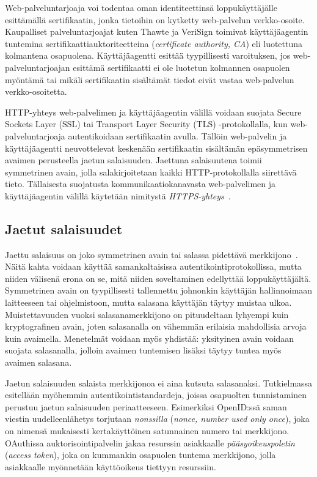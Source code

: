\documentclass[finnish,gradu]{tktltiki}
\begin{document}
  Web-palveluntarjoaja voi todentaa oman identiteettinsä loppukäyttäjälle esittämällä sertifikaatin, jonka tietoihin on kytketty web-palvelun verkko-osoite. Kaupalliset palveluntarjoajat kuten Thawte ja VeriSign toimivat käyttäjäagentin tuntemina sertifikaattiauktoriteetteina (\emph{certificate authority, CA}) eli luotettuna kolmantena osapuolena. Käyttäjäagentti esittää tyypillisesti varoituksen, jos web-palveluntarjoajan esittämä sertifikaatti ei ole luotetun kolmannen osapuolen myöntämä tai mikäli sertifikaatin sisältämät tiedot eivät vastaa web-palvelun verkko-osoitetta.

  HTTP-yhteys web-palvelimen ja käyttäjäagentin välillä voidaan suojata Secure Sockets Layer (SSL) tai Transport Layer Security (TLS) -protokollalla, kun web-pal\-ve\-luntarjoaja autentikoidaan sertifikaatin avulla. Tällöin web-palvelin ja käyttäjäagentti neuvottelevat keskenään sertifikaatin sisältämän epäsymmetrisen avaimen perusteella jaetun salaisuuden. Jaettuna salaisuutena toimii symmetrinen avain, jolla salakirjoitetaan kaikki HTTP-protokollalla siirettävä tieto. Tällaisesta suojatusta kommunikaatiokanavasta web-palvelimen ja käyttäjäagentin välillä käytetään nimitystä \emph{HTTPS-yhteys}~\cite{rfc_https_2818}.


  \subsection{Jaetut salaisuudet} %
  \label{sub:jaetut_salaisuudet}

  Jaettu salaisuus on joko symmetrinen avain tai salassa pidettävä merkkijono~\cite{NIST_SP800-63-1}. Näitä kahta voidaan käyttää samankaltaisissa autentikointiprotokollissa, mutta niiden välisenä erona on se, mitä niiden soveltaminen edellyttää loppukäyttäjältä. Symmetrinen avain on tyypillisesti tallennettu johnonkin käyttäjän hallinnoimaan laitteeseen tai ohjelmistoon, mutta salasana käyttäjän täytyy muistaa ulkoa. Muistettavuuden vuoksi salasanamerkkijono on pituudeltaan lyhyempi kuin kryptografinen avain, joten salasanalla on vähemmän erilaisia mahdollisia arvoja kuin avaimella. Menetelmät voidaan myös yhdistää: yksityinen avain voidaan suojata salasanalla, jolloin avaimen tuntemisen lisäksi täytyy tuntea myös avaimen salasana.

  Jaetun salaisuuden salaista merkkijonoa ei aina kutsuta salasanaksi. Tutkielmassa esitellään myöhemmin autentikointistandardeja, joissa osapuolten tunnistaminen perustuu jaetun salaisuuden periaatteeseen. Esimerkiksi OpenID:ssä saman viestin uudelleenlähetys torjutaan \emph{nonssilla} (\emph{nonce, number used only once}), joka on nimensä mukaisesti kertakäyttöinen satunnainen numero tai merkkijono. OAuthissa auktorisointipalvelin jakaa resurssin asiakkaalle \emph{pääsyoikeuspoletin} (\emph{access token}), joka on kummankin osapuolen tuntema merkkijono, jolla asiakkaalle myönnetään käyttöoikeus tiettyyn resurssiin.
\end{document}
